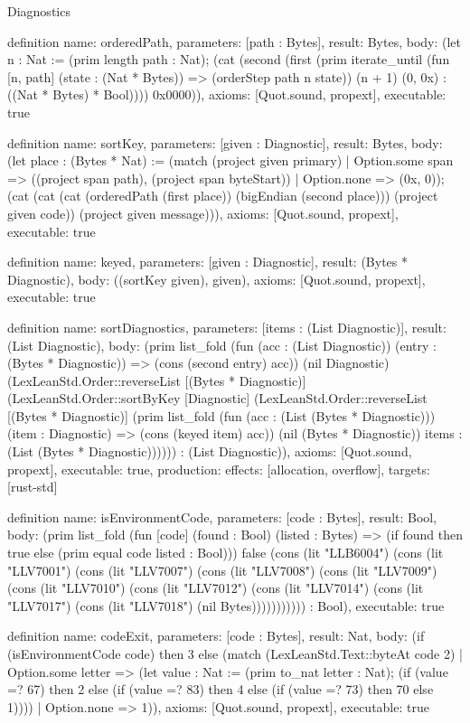\begin{lexlean}{Diagnostics}
\begin{semanticmodule}
definition{
  name: orderedPath,
  parameters: [path : Bytes],
  result: Bytes,
  body: (let n : Nat := (prim length path : Nat); (cat (second (first (prim iterate_until (fun [n, path] (state : (Nat * Bytes)) => (orderStep path n state)) (n + 1) (0, 0x) : ((Nat * Bytes) * Bool)))) 0x0000)),
  axioms: [Quot.sound, propext],
  executable: true
}

definition{
  name: sortKey,
  parameters: [given : Diagnostic],
  result: Bytes,
  body: (let place : (Bytes * Nat) := (match (project given primary)
    | Option.some span => ((project span path), (project span byteStart))
    | Option.none => (0x, 0)); (cat (cat (cat (orderedPath (first place)) (bigEndian (second place))) (project given code)) (project given message))),
  axioms: [Quot.sound, propext],
  executable: true
}

definition{
  name: keyed,
  parameters: [given : Diagnostic],
  result: (Bytes * Diagnostic),
  body: ((sortKey given), given),
  axioms: [Quot.sound, propext],
  executable: true
}

definition{
  name: sortDiagnostics,
  parameters: [items : (List Diagnostic)],
  result: (List Diagnostic),
  body: (prim list_fold (fun (acc : (List Diagnostic)) (entry : (Bytes * Diagnostic)) => (cons (second entry) acc)) (nil Diagnostic) (LexLeanStd.Order::reverseList [(Bytes * Diagnostic)] (LexLeanStd.Order::sortByKey [Diagnostic] (LexLeanStd.Order::reverseList [(Bytes * Diagnostic)] (prim list_fold (fun (acc : (List (Bytes * Diagnostic))) (item : Diagnostic) => (cons (keyed item) acc)) (nil (Bytes * Diagnostic)) items : (List (Bytes * Diagnostic)))))) : (List Diagnostic)),
  axioms: [Quot.sound, propext],
  executable: true,
  production: {effects: [allocation, overflow], targets: [rust-std]}
}

definition{
  name: isEnvironmentCode,
  parameters: [code : Bytes],
  result: Bool,
  body: (prim list_fold (fun [code] (found : Bool) (listed : Bytes) => (if found then true else (prim equal code listed : Bool))) false (cons (lit "LLB6004") (cons (lit "LLV7001") (cons (lit "LLV7007") (cons (lit "LLV7008") (cons (lit "LLV7009") (cons (lit "LLV7010") (cons (lit "LLV7012") (cons (lit "LLV7014") (cons (lit "LLV7017") (cons (lit "LLV7018") (nil Bytes))))))))))) : Bool),
  executable: true
}

definition{
  name: codeExit,
  parameters: [code : Bytes],
  result: Nat,
  body: (if (isEnvironmentCode code) then 3 else (match (LexLeanStd.Text::byteAt code 2)
    | Option.some letter => (let value : Nat := (prim to_nat letter : Nat); (if (value =? 67) then 2 else (if (value =? 83) then 4 else (if (value =? 73) then 70 else 1))))
    | Option.none => 1)),
  axioms: [Quot.sound, propext],
  executable: true
}


\end{semanticmodule}
\end{lexlean}
